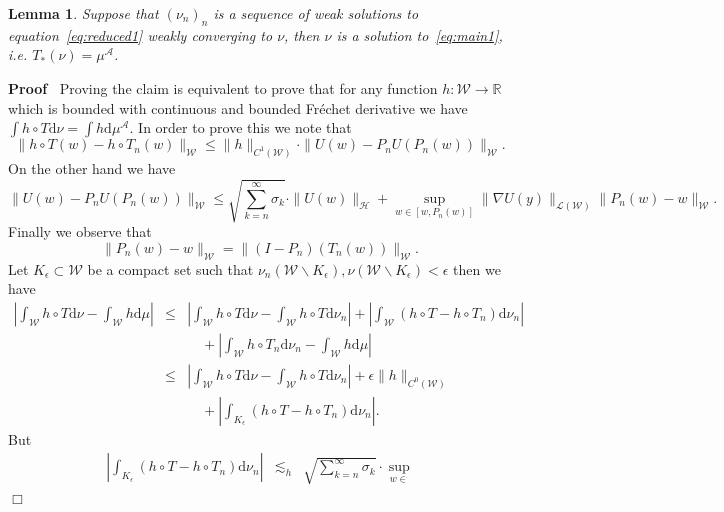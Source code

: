 \documentclass[a4paper,10pt]{article}
\newcommand{\asterisk}{\mathord{*}}
\newcommand{\mathd}{\mathrm{d}}
\newenvironment{proof}{\noindent\textbf{Proof\ }}{\hspace*{\fill}$\Box$\medskip}
\newtheorem{lemma}{Lemma}
\begin{document}
\begin{lemma}
  \label{lemma_reduced4}Suppose that $(\nu_n)_n$ is a sequence of weak
  solutions to equation~{\eqref{eq:reduced1}} weakly converging to $\nu$, then
  $\nu$ is a solution to~{\eqref{eq:main1}}, i.e. $T_{\asterisk} (\nu) =
  \mu^{\mathcal{A}}$.
\end{lemma}

\begin{proof}
  Proving the claim is equivalent to prove that for any function $h :
  \mathcal{W} \rightarrow \mathbb{R}$ which is bounded with continuous and
  bounded Fr{\'e}chet derivative we have $\int h \circ T \mathd \nu = \int h
  \mathd \mu^{\mathcal{A}}$. In order to prove this we note that
  \[ \| h \circ T (w) - h \circ T_n (w) \|_{\mathcal{W}} \leqslant \| h
     \|_{C^1 (\mathcal{W})} \cdot \| U (w) - P_n U (P_n (w)) \|_{\mathcal{W}}
     . \]
  On the other hand we have
  \[ \| U (w) - P_n U (P_n (w)) \|_{\mathcal{W}} \leqslant \sqrt{\sum_{k =
     n}^{\infty} \sigma_k} \cdot \| U (w) \|_{\mathcal{H}} + \sup_{w \in [w,
     P_n (w)]} \| \nabla U (y) \|_{\mathcal{L} (\mathcal{W})} \| P_n (w) - w
     \|_{\mathcal{W}} . \]
  Finally we observe that
  \[ \| P_n (w) - w \|_{\mathcal{W}} = \| (I - P_n) (T_n (w)) \|_{\mathcal{W}}
     . \]
  Let $K_{\epsilon} \subset \mathcal{W}$ be a compact set such that $\nu_n
  (\mathcal{W} \backslash K_{\epsilon}), \nu (\mathcal{W} \backslash
  K_{\epsilon}) < \epsilon$ then we have
  \begin{eqnarray}
    \left| \int_{\mathcal{W}} h \circ T \mathd \nu - \int_{\mathcal{W}} h
    \mathd \mu \right| & \leqslant & \left| \int_{\mathcal{W}} h \circ T
    \mathd \nu - \int_{\mathcal{W}} h \circ T \mathd \nu_n \right| + \left|
    \int_{\mathcal{W}} (h \circ T - h \circ T_n) \mathd \nu_n \right|
    \nonumber\\
    &  & \quad + \left| \int_{\mathcal{W}} h \circ T_n \mathd \nu_n -
    \int_{\mathcal{W}} h \mathd \mu \right| \nonumber\\
    & \leqslant & \left| \int_{\mathcal{W}} h \circ T \mathd \nu -
    \int_{\mathcal{W}} h \circ T \mathd \nu_n \right| + \epsilon \| h \|_{C^0
    (\mathcal{W})} \nonumber\\
    &  & \quad + \left| \int_{K_{\epsilon}} (h \circ T - h \circ T_n) \mathd
    \nu_n \right| .  \label{eq:reduced5}
  \end{eqnarray}
  But
  \begin{eqnarray}
    \left| \int_{K_{\epsilon}} (h \circ T - h \circ T_n) \mathd \nu_n \right|
    & \lesssim_h & \sqrt{\sum_{k = n}^{\infty} \sigma_k} \cdot \sup_{w \in
}
\end{eqnarray}
\end{proof}
\end{document}
